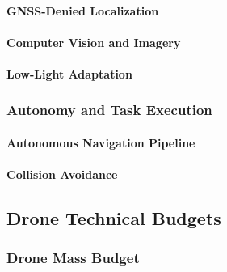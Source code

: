 \paragraph{GNSS-Denied Localization}
\label{par:gnss_denied_localization}


\paragraph{Computer Vision and Imagery}
\label{par:computer_vision_imagery}


\paragraph{Low-Light Adaptation}
\label{par:drone_low_light_adaptation}


\subsubsection{Autonomy and Task Execution}
\label{subsubsec:autonomy_task_execution}

\paragraph{Autonomous Navigation Pipeline}
\label{par:autonomous_navigation_pipeline}


\paragraph{Collision Avoidance}
\label{par:drone_collision_avoidance}


\subsection{Drone Technical Budgets}
\label{subsec:drone_technical_budgets}

\subsubsection{Drone Mass Budget}
\label{subsubsec:drone_mass_budget}


